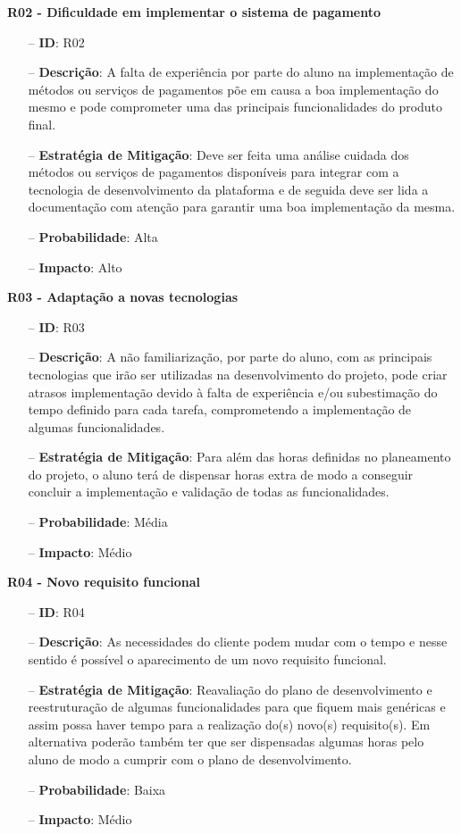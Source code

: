\textbf{R02 - Dificuldade em implementar o sistema de pagamento}
\begin{itemize}
	\item[--] \textbf{ID}: R02
	\item[--] \textbf{Descrição}: A falta de experiência por parte do aluno na implementação de métodos ou serviços de pagamentos põe em causa a boa implementação do mesmo e pode comprometer uma das principais funcionalidades do produto final.
	\item[--] \textbf{Estratégia de Mitigação}: Deve ser feita uma análise cuidada dos métodos ou serviços de pagamentos disponíveis para integrar com a tecnologia de desenvolvimento da plataforma e de seguida deve ser lida a documentação com atenção para garantir uma boa implementação da mesma.
	\item[--] \textbf{Probabilidade}: Alta
	\item[--] \textbf{Impacto}: Alto
\end{itemize}

\textbf{R03 - Adaptação a novas tecnologias }
\begin{itemize}
	\item[--] \textbf{ID}: R03
	\item[--] \textbf{Descrição}: A não familiarização, por parte do aluno, com as principais tecnologias que irão ser utilizadas na desenvolvimento do projeto, pode criar atrasos implementação devido à falta de experiência e/ou subestimação do tempo definido para cada tarefa, comprometendo a implementação de algumas funcionalidades.
	\item[--] \textbf{Estratégia de Mitigação}: Para além das horas definidas no planeamento do projeto, o aluno terá de dispensar horas extra de modo a conseguir concluir a implementação e validação de todas as funcionalidades.
	\item[--] \textbf{Probabilidade}: Média
	\item[--] \textbf{Impacto}: Médio
\end{itemize}

\textbf{R04 - Novo requisito funcional}
\begin{itemize}
	\item[--] \textbf{ID}: R04
	\item[--] \textbf{Descrição}: As necessidades do cliente podem mudar com o tempo e nesse sentido é possível o aparecimento de um novo requisito funcional.
	\item[--] \textbf{Estratégia de Mitigação}: Reavaliação do plano de desenvolvimento e reestruturação de algumas funcionalidades para que fiquem mais genéricas e assim possa haver tempo para a realização do(s) novo(s) requisito(s). Em alternativa poderão também ter que ser dispensadas algumas horas pelo aluno de modo a cumprir com o plano de desenvolvimento.
	\item[--] \textbf{Probabilidade}: Baixa 
	\item[--] \textbf{Impacto}: Médio
\end{itemize}

